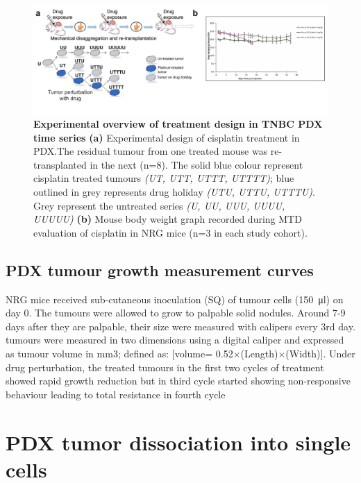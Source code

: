 \begin{figure}
\centering
\includegraphics[width=\textwidth]{Figures/chap2/treatmentdesignMTD.pdf}
	
\caption[Experimental overview of TNBC PDX treated time series]
	{\small
	\textbf{Experimental overview of treatment design in TNBC PDX time series}
\textbf{(a)} Experimental design of cisplatin treatment in PDX.The residual tumour from one treated mouse was re-transplanted in the next (n=8). The solid blue colour represent cisplatin treated tumours \textit{(UT, UTT, UTTT, UTTTT)}; blue outlined in grey represents drug holiday \textit{(UTU, UTTU, UTTTU)}. Grey represent the untreated series \textit{(U, UU, UUU, UUUU, UUUUU)} \textbf{(b)} Mouse body weight graph recorded during \ac{MTD} evaluation of cisplatin in NRG mice (n=3 in each study cohort).}
	
	\label{fig:treatmentdesignMTD}
\end{figure}


\subsection{PDX tumour growth measurement curves} 
NRG mice received sub-cutaneous inoculation (SQ) of tumour cells (\SI{150}{\ul}) on day 0. 
The tumours were allowed to grow to palpable solid nodules.
Around 7-9 days after they are palpable, their size were measured with calipers every 3rd day. 
tumours were measured in two dimensions using a digital caliper and expressed as tumour volume in mm3; defined as: [volume= 0.52$\times$(Length)$\times$(Width)].
Under drug perturbation, the treated tumours in the first two cycles of treatment showed rapid growth reduction but in third cycle started showing non-responsive behaviour leading to total resistance in fourth cycle 



\section{PDX tumor dissociation into single cells}

